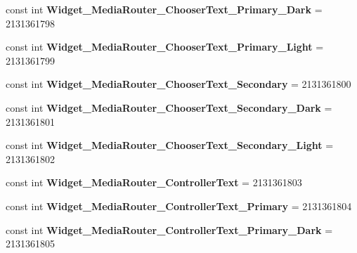 \begin{DoxyCompactItemize}
const int {\bfseries Widget\+\_\+\+Media\+Router\+\_\+\+Chooser\+Text\+\_\+\+Primary\+\_\+\+Dark} = 2131361798
\item 
\mbox{\label{class_sample_app_1_1_droid_1_1_resource_1_1_style_a81f6446ac6de6b0451b2280ada10ad9d}} 
const int {\bfseries Widget\+\_\+\+Media\+Router\+\_\+\+Chooser\+Text\+\_\+\+Primary\+\_\+\+Light} = 2131361799
\item 
\mbox{\label{class_sample_app_1_1_droid_1_1_resource_1_1_style_af48272e51041be8b4a91108e9b2cef0a}} 
const int {\bfseries Widget\+\_\+\+Media\+Router\+\_\+\+Chooser\+Text\+\_\+\+Secondary} = 2131361800
\item 
\mbox{\label{class_sample_app_1_1_droid_1_1_resource_1_1_style_ae6f509779c1c92fb58a1a23ab3272e65}} 
const int {\bfseries Widget\+\_\+\+Media\+Router\+\_\+\+Chooser\+Text\+\_\+\+Secondary\+\_\+\+Dark} = 2131361801
\item 
\mbox{\label{class_sample_app_1_1_droid_1_1_resource_1_1_style_a37c8ebcc836220053c779deabbf5c4b4}} 
const int {\bfseries Widget\+\_\+\+Media\+Router\+\_\+\+Chooser\+Text\+\_\+\+Secondary\+\_\+\+Light} = 2131361802
\item 
\mbox{\label{class_sample_app_1_1_droid_1_1_resource_1_1_style_aba3b129ad49cb03951fb971d0cc2da9a}} 
const int {\bfseries Widget\+\_\+\+Media\+Router\+\_\+\+Controller\+Text} = 2131361803
\item 
\mbox{\label{class_sample_app_1_1_droid_1_1_resource_1_1_style_a909053ec43993bdfa8226ad72fb6ce45}} 
const int {\bfseries Widget\+\_\+\+Media\+Router\+\_\+\+Controller\+Text\+\_\+\+Primary} = 2131361804
\item 
\mbox{\label{class_sample_app_1_1_droid_1_1_resource_1_1_style_ace02a3a5a7e5ed02a8d338a2185fa818}} 
const int {\bfseries Widget\+\_\+\+Media\+Router\+\_\+\+Controller\+Text\+\_\+\+Primary\+\_\+\+Dark} = 2131361805
\item 

\end{DoxyCompactItemize}
